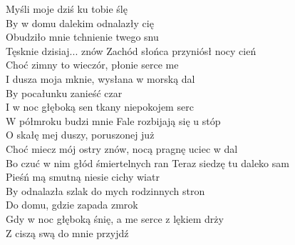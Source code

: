 
Myśli moje dziś ku tobie ślę\\
By w domu dalekim odnalazły cię\\
Obudziło mnie tchnienie twego snu\\
Tęsknie dzisiaj... znów
\hops
Zachód słońca przyniósł nocy cień\\
Choć zimny to wieczór, płonie serce me\\
I dusza moja mknie, wysłana w morską dal\\
By pocałunku zanieść czar
\hops
{} {}\\
 I w noc głęboką sen tkany niepokojem serc\\
 W półmroku budzi mnie
\hops
Fale rozbijają się u stóp\\
O skałę mej duszy, poruszonej już\\
Choć miecz mój ostry znów, nocą pragnę uciec w dal\\
Bo czuć w nim głód śmiertelnych ran
\hops
Teraz siedzę tu daleko sam\\
Pieśń mą smutną niesie cichy wiatr\\
By odnalazła szlak do mych rodzinnych stron\\
Do domu, gdzie zapada zmrok
\hops
{} {}\\
 Gdy w noc głęboką śnię, a me serce z lękiem drży\\
 Z ciszą swą do mnie przyjdź